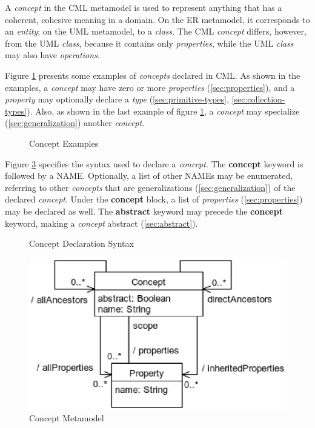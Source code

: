 A \emph{concept} in the CML metamodel is used to represent anything
that has a coherent, cohesive meaning in a domain.
On the ER \cite{er} metamodel,
it corresponds to an \emph{entity};
on the UML \cite{uml} metamodel,
to a \emph{class}.
The CML \emph{concept} differs, however, from the UML \emph{class},
because it contains only \emph{properties},
while the UML \emph{class} may also have \emph{operations}.

Figure \ref{fig:ex:concepts} presents some examples of \emph{concepts} declared in CML.
As shown in the examples,
a \emph{concept} may have zero or more \emph{properties}
(\ref{sec:properties}),
and a \emph{property} may optionally declare a \emph{type}
(\ref{sec:primitive-types}, \ref{sec:collection-types}).
Also, as shown in the last example of figure \ref{fig:ex:concepts},
a \emph{concept} may specialize
(\ref{sec:generalization})
another \emph{concept}.

\begin{figure}
\verbatimfont{\small}
\begin{framed}

\end{framed}
\caption{Concept Examples}
\label{fig:ex:concepts}
\end{figure}

Figure \ref{fig:stx:concept} specifies the syntax used
to declare a \emph{concept}.
The \textbf{concept} keyword is followed by a NAME.
Optionally, a list of other NAMEs may be enumerated,
referring to other \emph{concepts}
that are generalizations (\ref{sec:generalization}) of the declared \emph{concept}.
Under the \textbf{concept} block,
a list of \emph{properties} (\ref{sec:properties}) may be declared as well.
The \textbf{abstract} keyword may precede the \textbf{concept} keyword, making a \emph{concept} abstract (\ref{sec:abstract}).

\begin{figure}
\verbatimfont{\small}
\begin{framed}

\end{framed}
\caption{Concept Declaration Syntax}
\label{fig:stx:concept}
\end{figure}

\begin{figure}
\includegraphics[width=\textwidth]{concepts/concepts}
\caption{Concept Metamodel}
\label{fig:stx:concept}
\end{figure}
